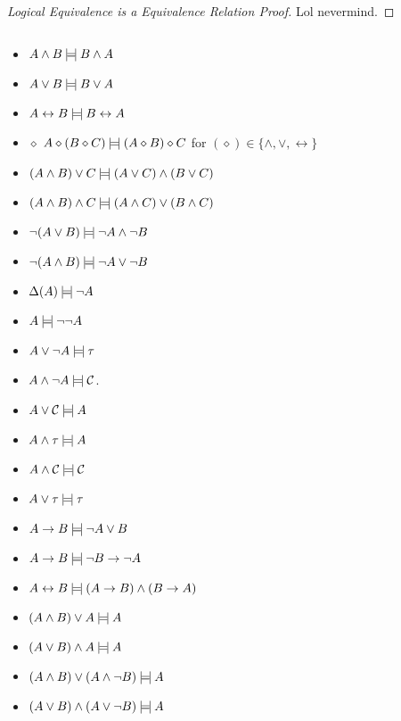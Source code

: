 \documentclass[12pt]{article}
\begin{document}
\bboxproof
\begin{proof}[Logical Equivalence is a Equivalence Relation Proof]
  Lol nevermind.  
\end{proof}
\ebox

\bboxexam
\begin{exam}\(\,\)
  \begin{itemize}
    \item {} \(A\wedge B\mathbin{\mid\!=\!\mid} B\wedge A\)
    \item {} \(A\vee B\mathbin{\mid\!=\!\mid} B\vee A\)
    \item {} \(A\leftrightarrow B\mathbin{\mid\!=\!\mid} B\leftrightarrow A\)
    \item \(\diamond\) \(A\diamond(B\diamond C)\mathbin{\mid\!=\!\mid}(A\diamond B)\diamond C\)
      for \((\diamond)\in\{\wedge,\vee,\leftrightarrow\}\)
    \item {} \((A\wedge B)\vee C\mathbin{\mid\!=\!\mid}(A\vee C)\wedge(B\vee C)\)
    \item {} \((A\wedge B)\wedge C\mathbin{\mid\!=\!\mid}(A\wedge C)\vee(B\wedge C)\)
    \item {} \(\neg(A\vee B)\mathbin{\mid\!=\!\mid}\neg A\wedge\neg B\)
    \item {} \(\neg(A\wedge B)\mathbin{\mid\!=\!\mid}\neg A\vee\neg B\)
    \item \(\Delta(A)\mathbin{\mid\!=\!\mid}\neg A\)
    \item \(A\mathbin{\mid\!=\!\mid}\neg\neg A\)
    \item \(A\vee\neg A\mathbin{\mid\!=\!\mid}\tau\)
    \item \(A\wedge\neg A\mathbin{\mid\!=\!\mid}\mathcal C\).
    \item {} \(A\vee\mathcal C\mathbin{\mid\!=\!\mid} A\)
    \item {} \(A\wedge\tau\mathbin{\mid\!=\!\mid} A\)
    \item {} \(A\wedge\mathcal C\mathbin{\mid\!=\!\mid}\mathcal C\)
    \item {} \(A\vee\tau\mathbin{\mid\!=\!\mid} \tau\)
    \item \(A\rightarrow B\mathbin{\mid\!=\!\mid}\neg A\vee B\)
    \item {} \(A\rightarrow B\mathbin{\mid\!=\!\mid} \neg B\rightarrow\neg A\)
    \item \(A\leftrightarrow B\mathbin{\mid\!=\!\mid}(A\rightarrow B)\wedge(B\rightarrow A)\)
    \item {} \((A\wedge B)\vee A\mathbin{\mid\!=\!\mid} A\)
    \item {} \((A\vee B)\wedge A\mathbin{\mid\!=\!\mid} A\)
    \item \((A\wedge B)\vee(A\wedge\neg B)\mathbin{\mid\!=\!\mid} A\)
    \item \((A\vee B)\wedge(A\vee\neg B)\mathbin{\mid\!=\!\mid} A\)
  \end{itemize}
\end{exam}
\ebox
\end{document}

